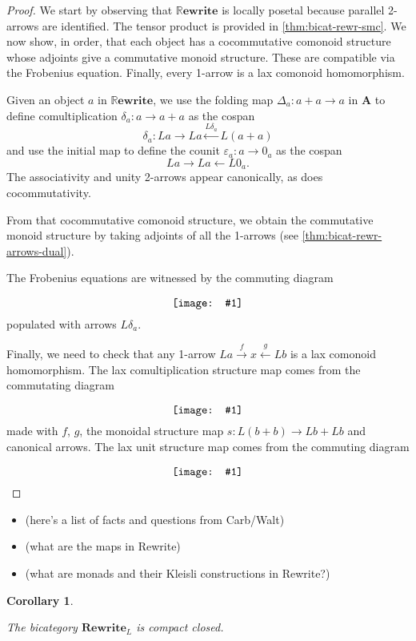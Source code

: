 \documentclass{amsart}
\renewcommand{\epsilon}{\varepsilon}
\newcommand{\A}{\cat{A}}
\newcommand{\cat}[1]{\mathbf{#1}}
\newcommand{\from}{\colon}
\newcommand{\xto}[1]{\xrightarrow{#1}}
\newcommand{\xgets}[1]{\xleftarrow{#1}}
\newcommand{\diagram}[1]{\raisebox{-0.5\height}{\texttt{[image: \#1]}}}
\newcommand{\Rewrite}{\mathbf{Rewrite} }
\newcommand{\RRewrite}{ \mathbb{R}\mathbf{ewrite} }
\newcommand{\edit}[1]{\textcolor{editcolour}{(#1)}}
\newtheorem{corollary}[theorem]{Corollary}
\theoremstyle{remark}
\theoremstyle{definition}
\begin{document}
\begin{proof}

  We start by observing that $ \RRewrite $ is locally posetal because
  parallel 2-arrows are identified. The tensor product is provided in
  \ref{thm:bicat-rewr-smc}. We now show, in order, that each object
  has a cocommutative comonoid structure whose adjoints give a
  commutative monoid structure.  These are compatible via the
  Frobenius equation. Finally, every 1-arrow is a lax comonoid
  homomorphism.
	
  Given an object $ a $ in $ \RRewrite $, we use the folding map
  $ \Delta_{a} \from a + a \to a $ in $ \A $ to define
  comultiplication $ \delta_a \from a \to a + a $ as the cospan
  \[
    \delta_a \from La \to La \xgets{L\delta_a} L(a + a)
  \]
  and use the initial map to define the counit
  $ \epsilon_a \from a \to 0_a $ as the cospan
  \[
    La \to La \gets L0_a.
  \]
  The associativity and unity 2-arrows appear canonically, as does
  cocommutativity.
	
  From that cocommutative comonoid structure, we obtain the
  commutative monoid structure by taking adjoints of all the 1-arrows
  (see \ref{thm:bicat-rewr-arrows-dual}).
	
  The Frobenius equations are witnessed by the commuting diagram
  \[
    \diagram{diag_nlr_bi-rewrite-frobenius}
  \]
  populated with arrows $ L \delta_a $.
	
  Finally, we need to check that any 1-arrow
  $ La \xto{f} x \xgets{g} Lb $ is a lax comonoid homomorphism. The
  lax comultiplication structure map comes from the commutating
  diagram
  \[
    \diagram{diag_nlr_bi-rewrite-lax-comul}
  \]
  made with $ f $, $ g $, the monoidal structure map
  $ s \from L(b+b) \to Lb+Lb $ and canonical arrows. The lax unit
  structure map comes from the commuting diagram
  \[
    \diagram{diag_nlr_bi-rewrite-lax-counit} \qedhere
  \]
  
\end{proof}

\begin{itemize}
	\item \edit{here's a list of facts and questions from Carb/Walt}
	\item \edit{what are the maps in Rewrite}
	\item \edit{what are monads and their Kleisli constructions in Rewrite?}
\end{itemize}

\begin{corollary} \label{thm:bit-rewr-comp-closed}
  
  The bicategory $ \Rewrite_L$ is compact closed.
  
\end{corollary}
\end{document}
